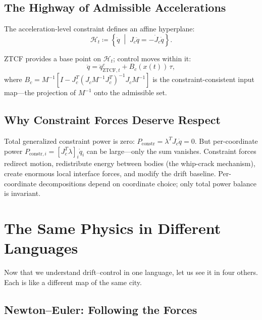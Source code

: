 \documentclass[11pt]{article}
\begin{document}
\subsection{The Highway of Admissible Accelerations}

The acceleration-level constraint defines an affine hyperplane:
\begin{equation}\label{eq:hyperplane}
\mathcal{H}_t \coloneqq \left\{\ddot{q}\;\middle|\;J_c\ddot{q} = -\dot{J}_c\dot{q}\right\}.
\end{equation}

ZTCF provides a base point on $\mathcal{H}_t$; control moves within it:
\begin{equation}\label{eq:hyperplane-control}
\ddot{q} = \ddot{q}_{\mathrm{ZTCF},t}^{c} + B_c(x(t))\,\tau,
\end{equation}
where $B_c = M^{-1}[I - J_c^T(J_cM^{-1}J_c^T)^{-1}J_cM^{-1}]$ is the constraint-consistent input map---the projection of $M^{-1}$ onto the admissible set.

\subsection{Why Constraint Forces Deserve Respect}

Total generalized constraint power is zero: $P_{\mathrm{constr}} = \lambda^T J_c\dot{q} = 0$. But per-coordinate power $P_{\mathrm{constr},i}=[J_c^T\lambda]_i\dot{q}_i$ can be large---only the sum vanishes. Constraint forces redirect motion, redistribute energy between bodies (the whip-crack mechanism), create enormous local interface forces, and modify the drift baseline. Per-coordinate decompositions depend on coordinate choice; only total power balance is invariant.


\section{The Same Physics in Different Languages}\label{sec:other-frameworks}

Now that we understand drift--control in one language, let us see it in four others. Each is like a different map of the same city.

\subsection{Newton--Euler: Following the Forces}\label{sec:newton-euler}
\end{document}
